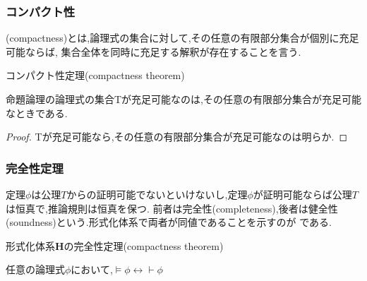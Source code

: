 \subsubsection{コンパクト性}
(compactness)とは,論理式の集合に対して,その任意の有限部分集合が個別に充足可能ならば,
集合全体を同時に充足する解釈が存在することを言う.

\begin{thm}
 コンパクト性定理(compactness theorem)

 命題論理の論理式の集合Tが充足可能なのは,その任意の有限部分集合が充足可能なときである.

\end{thm}
\begin{proof}
 Tが充足可能なら,その任意の有限部分集合が充足可能なのは明らか.
\end{proof}

\subsubsection{完全性定理}
定理$\phi$は公理$T$からの証明可能でないといけないし,定理$\phi$が証明可能ならば公理$T$は恒真で,推論規則は恒真を保つ.
前者は完全性(completeness),後者は健全性(soundness)という.形式化体系で両者が同値であることを示すのが
である.

\begin{thm}
 形式化体系$\bm{H}$の完全性定理(compactness theorem)

 任意の論理式$\phi$において,$\models \phi \leftrightarrow \vdash \phi$
\end{thm}

